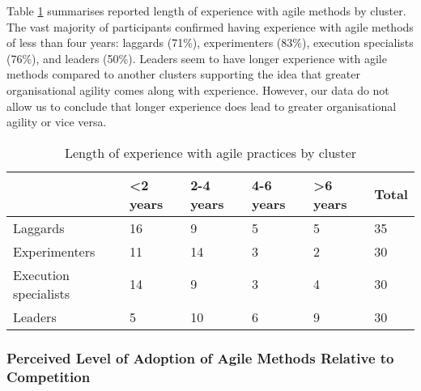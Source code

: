 \documentclass{article}
\newcommand{\myremark}[1]{{#1}}
\newcommand{\ikremark}[1]{\myremark{\color{blue} [Ivan: #1]}}
\begin{document}
Table \ref{tab:length-experience} summarises reported length of experience with agile methods by cluster. The vast majority of participants confirmed having experience with agile methods of less than four years: laggards (71\%), experimenters (83\%), execution specialists (76\%), and leaders (50\%). Leaders seem to have longer experience with agile methods compared to another clusters supporting the idea that greater organisational agility comes along with experience. However, our data do not allow us to conclude that longer experience does lead to greater organisational agility or vice versa.
%
%
\begin{table}[hbt]
 \small
 \caption{Length of experience with agile practices by cluster}
  \centering
  \begin{tabular}{llllll}
     & <2 years & 2-4 years & 4-6 years & >6 years & Total \\
    \midrule
    Laggards & 16 & 9 & 5 & 5 & 35 \\
    Experimenters & 11 & 14 & 3 & 2 & 30 \\
    Execution specialists & 14 & 9 & 3 & 4 & 30 \\
    Leaders & 5 & 10 & 6 & 9 & 30 \\
     \midrule
  \end{tabular}
  \label{tab:length-experience}
 \end{table}


\subsubsection{Perceived Level of Adoption of Agile Methods Relative to Competition}
\end{document}
